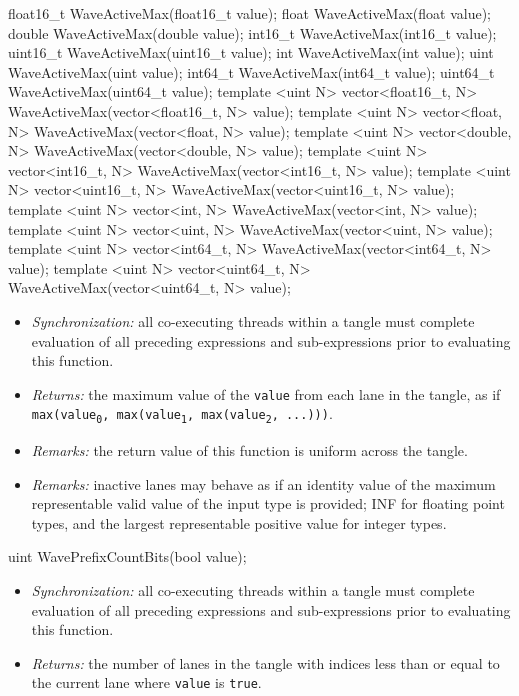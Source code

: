 \begin{HLSL}
float16_t WaveActiveMax(float16_t value);
float WaveActiveMax(float value);
double WaveActiveMax(double value);
int16_t WaveActiveMax(int16_t value);
uint16_t WaveActiveMax(uint16_t value);
int WaveActiveMax(int value);
uint WaveActiveMax(uint value);
int64_t WaveActiveMax(int64_t value);
uint64_t WaveActiveMax(uint64_t value);
template <uint N> vector<float16_t, N> WaveActiveMax(vector<float16_t, N> value);
template <uint N> vector<float, N> WaveActiveMax(vector<float, N> value);
template <uint N> vector<double, N> WaveActiveMax(vector<double, N> value);
template <uint N> vector<int16_t, N> WaveActiveMax(vector<int16_t, N> value);
template <uint N> vector<uint16_t, N> WaveActiveMax(vector<uint16_t, N> value);
template <uint N> vector<int, N> WaveActiveMax(vector<int, N> value);
template <uint N> vector<uint, N> WaveActiveMax(vector<uint, N> value);
template <uint N> vector<int64_t, N> WaveActiveMax(vector<int64_t, N> value);
template <uint N> vector<uint64_t, N> WaveActiveMax(vector<uint64_t, N> value);
\end{HLSL}

\begin{itemize}
  \item \textit{Synchronization:} all co-executing threads within a \gls{tangle}
  must complete evaluation of all preceding expressions and sub-expressions
  prior to evaluating this function.
  \item \textit{Returns:} the maximum value of the \texttt{value} from each
  \gls{lane} in the \gls{tangle}, as if \texttt{max(value\textsubscript{0},
  max(value\textsubscript{1}, max(value\textsubscript{2}, ...)))}.
  \item \textit{Remarks:} the return value of this function is uniform across
  the \gls{tangle}.
  \item \textit{Remarks:} inactive \gls{lane}s may behave as if an identity
  value of the maximum representable valid value of the input type is provided;
  INF for floating point types, and the largest representable positive value
  for integer types.
\end{itemize}

\begin{HLSL}
uint WavePrefixCountBits(bool value);
\end{HLSL}

\begin{itemize}
  \item \textit{Synchronization:} all co-executing threads within a \gls{tangle}
  must complete evaluation of all preceding expressions and sub-expressions
  prior to evaluating this function.
  \item \textit{Returns:} the number of \gls{lane}s in the \gls{tangle} with
  indices less than or equal to the current \gls{lane} where \texttt{value} is
  \texttt{true}.
\end{itemize}

